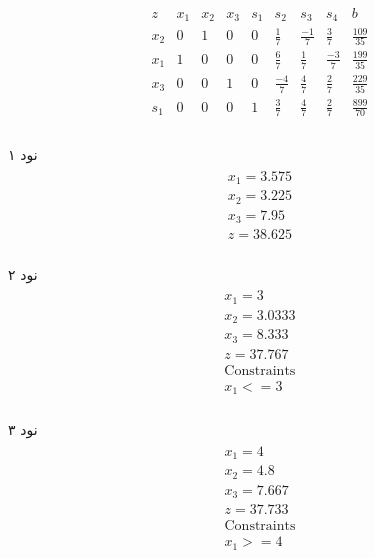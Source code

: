 \documentclass[paper=a4, fontsize=11pt]{article}
\numberwithin{equation}{section} %
\numberwithin{figure}{section} %
\numberwithin{table}{section} %
\begin{document}
\begin{equation}
\begin{array}{c|ccccccc|c}
	z & x_1 & x_2 & x_3 & s_1 & s_2 & s_3 & s_4 & b \\ \hline
	x_2 & 0 & 1 & 0 & 0 & \frac{1}{7} & \frac{-1}{7} & \frac{3}{7} & \frac{109}{35}\\ 
	x_1 & 1 & 0 & 0 & 0 & \frac{6}{7} & \frac{1}{7} & \frac{-3}{7} & \frac{199}{35}\\ 
	x_3 & 0 & 0 & 1 & 0 & \frac{-4}{7} & \frac{4}{7} & \frac{2}{7} & \frac{229}{35}\\ 
	s_1 & 0 & 0 & 0 & 1 & \frac{3}{7} & \frac{4}{7} & \frac{2}{7} & \frac{899}{70}\\ 
\end{array}
\end{equation}

\paragraph{}
نود ۱
\begin{align}
\begin{split}
	x_1 = 3.575\\
	x_2 = 3.225\\
	x_3 = 7.95\\
	z = 38.625
\end{split}
\end{align}

\paragraph{}
نود ۲
\begin{align}
\begin{split}
	x_1 = 3\\
	x_2 = 3.0333\\
	x_3 = 8.333\\
	z = 37.767\\
	\text{Constraints}\\
	x_1 <= 3
\end{split}
\end{align}

\paragraph{}
نود ۳
\begin{align}
\begin{split}
	x_1 = 4\\
	x_2 = 4.8\\
	x_3 = 7.667\\
	z = 37.733\\
	\text{Constraints}\\
	x_1 >= 4
\end{split}
\end{align}
\end{document}
